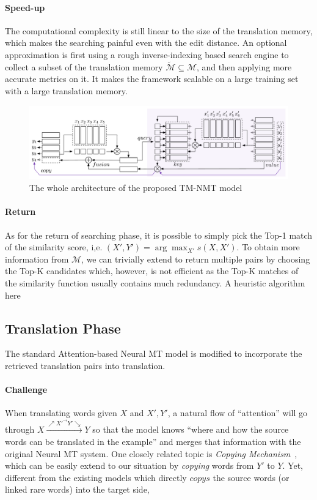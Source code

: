 \documentclass[11pt,letterpaper]{article}
\begin{document}
\paragraph{Speed-up} The computational complexity is still linear to the size of the translation memory, which makes the searching painful even with the edit distance. An optional approximation is first using a rough inverse-indexing based search engine to collect a subset of the translation memory $\tilde{\mathcal{M}}\subseteq \mathcal{M}$, and then applying more accurate metrics on it. It makes the framework scalable on a large training set with a large translation memory. 
\begin{figure}[htpb]
\label{framework}
\includegraphics[width=\linewidth]{figures/framework1.pdf}
\caption{The whole architecture of the proposed TM-NMT model}
\end{figure}

\paragraph{Return}
As for the return of searching phase, it is possible to simply pick the Top-1 match of the similarity score, i,e. $(X', Y')=\arg\max_{X'}s(X, X')$.  To obtain more information from $\mathcal{M}$, we can trivially extend to return multiple pairs by choosing the Top-K candidates which, however, is not efficient as the Top-K matches of the similarity function usually contains much redundancy.
A heuristic algorithm here

\subsection{Translation Phase}
The standard Attention-based Neural MT model is modified to incorporate the retrieved translation pairs into translation. 
\paragraph{Challenge}
When translating words given $X$ and $X', Y'$, a natural flow of ``attention'' will go through $X \xrightarrow{\nearrow X'^{\rightarrow}Y' \searrow} Y$ so that the model knows ``where and how the source words can be translated in the example'' and merges that information with the original Neural MT system. One closely related topic is \textit{Copying Mechanism}~\cite{gu2016incorporating,gulcehre2016pointing}, which can be easily extend to our situation by \textit{copying} words from $Y'$ to $Y$. Yet, different from the existing models which directly $copys$ the source words (or linked rare words) into the target side,
\end{document}
